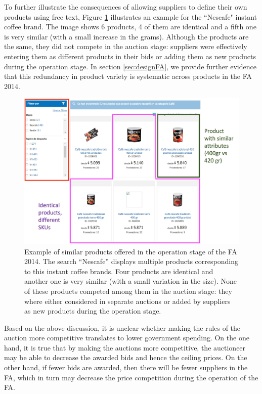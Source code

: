 To further illustrate the consequences of allowing suppliers to define their own products using free text, Figure \ref{fig:nescafe} illustrates an example for the ``Nescafe" instant coffee brand. The image shows 6 products, 4 of them are identical and a fifth one is very similar (with a small increase in the grams). Although the products are the same, they did not compete in the auction stage: suppliers were effectively entering them as different products in their bids or adding them as new products during the operation stage. In section \ref{sec:designFA}, we provide further evidence that this redundancy in product variety is systematic across products in the FA 2014. 

\begin{figure}
    \centering
    \includegraphics[scale=0.6]{imagenes/procurement/nescafe example.jpg}
    \caption{Example of similar products offered in the operation stage of the FA 2014. The search ``Nescafe'' displays multiple products corresponding to this instant coffee brands. Four products are identical and another one is very similar (with a small variation in the size). None of these products competed among them in the auction stage: they where either considered in separate auctions or added by suppliers as new products during the operation stage. }
    \label{fig:nescafe}
\end{figure}

 Based on the above discussion, it is unclear whether making the rules of the auction more competitive translates to lower government spending. On the one hand, it is true that by making the auctions more competitive, the auctioneer may be able to decrease the awarded bids and hence the ceiling prices. On the other hand, if fewer bids are awarded, then there will be fewer suppliers in the FA, which in turn may decrease the price competition during the operation of the FA. 

